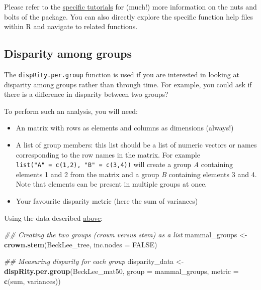 \documentclass[
]{book}
\newenvironment{Shaded}{\begin{snugshade}}{\end{snugshade}}
\newcommand{\CommentTok}[1]{\textcolor[rgb]{0.56,0.35,0.01}{\textit{#1}}}
\newcommand{\DataTypeTok}[1]{\textcolor[rgb]{0.13,0.29,0.53}{#1}}
\newcommand{\KeywordTok}[1]{\textcolor[rgb]{0.13,0.29,0.53}{\textbf{#1}}}
\newcommand{\NormalTok}[1]{#1}
\newcommand{\OtherTok}[1]{\textcolor[rgb]{0.56,0.35,0.01}{#1}}
\newcommand{\StringTok}[1]{\textcolor[rgb]{0.31,0.60,0.02}{#1}}
\providecommand{\tightlist}{%
  \setlength{\itemsep}{0pt}\setlength{\parskip}{0pt}}
\begin{document}
Please refer to the \protect\hyperlink{specific-tutorial}{specific tutorials} for (much!) more information on the nuts and bolts of the package.
You can also directly explore the specific function help files within R and navigate to related functions.

\hypertarget{disparity-among-groups}{%
\subsection{Disparity among groups}\label{disparity-among-groups}}

The \texttt{dispRity.per.group} function is used if you are interested in looking at disparity among groups rather than through time.
For example, you could ask if there is a difference in disparity between two groups?

To perform such an analysis, you will need:

\begin{itemize}
\tightlist
\item
  An matrix with rows as elements and columns as dimensions (always!)
\item
  A list of group members: this list should be a list of numeric vectors or names corresponding to the row names in the matrix. For example \texttt{list("A"\ =\ c(1,2),\ "B"\ =\ c(3,4))} will create a group \emph{A} containing elements 1 and 2 from the matrix and a group \emph{B} containing elements 3 and 4. Note that elements can be present in multiple groups at once.
\item
  Your favourite disparity metric (here the sum of variances)
\end{itemize}

Using the \citet{beckancient2014} data described \protect\hyperlink{example-data}{above}:

\begin{Shaded}
\begin{Highlighting}[]
\CommentTok{\#\# Creating the two groups (crown versus stem) as a list}
\NormalTok{mammal\_groups \textless{}{-}}\StringTok{ }\KeywordTok{crown.stem}\NormalTok{(BeckLee\_tree, }\DataTypeTok{inc.nodes =} \OtherTok{FALSE}\NormalTok{)}

\CommentTok{\#\# Measuring disparity for each group}
\NormalTok{disparity\_data \textless{}{-}}\StringTok{ }\KeywordTok{dispRity.per.group}\NormalTok{(BeckLee\_mat50,}
                                     \DataTypeTok{group =}\NormalTok{ mammal\_groups,}
                                     \DataTypeTok{metric =} \KeywordTok{c}\NormalTok{(sum, variances))}
\end{Highlighting}
\end{Shaded}
\end{document}
